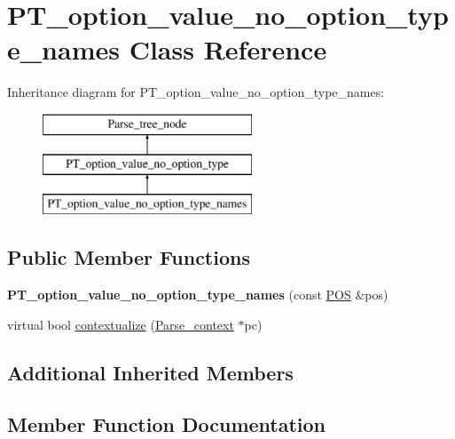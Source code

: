 \hypertarget{classPT__option__value__no__option__type__names}{}\section{P\+T\+\_\+option\+\_\+value\+\_\+no\+\_\+option\+\_\+type\+\_\+names Class Reference}
\label{classPT__option__value__no__option__type__names}
Inheritance diagram for P\+T\+\_\+option\+\_\+value\+\_\+no\+\_\+option\+\_\+type\+\_\+names\+:\begin{figure}[H]
\begin{center}
\leavevmode
\includegraphics[height=3.000000cm]{classPT__option__value__no__option__type__names}
\end{center}
\end{figure}
\subsection*{Public Member Functions}
\begin{DoxyCompactItemize}
\item 
\mbox{\label{classPT__option__value__no__option__type__names_a7d6ef7436bb4f977e8b4622054dd9e30}} 
{\bfseries P\+T\+\_\+option\+\_\+value\+\_\+no\+\_\+option\+\_\+type\+\_\+names} (const \mbox{\hyperlink{structYYLTYPE}{P\+OS}} \&pos)
\item 
virtual bool \mbox{\hyperlink{classPT__option__value__no__option__type__names_a3d4e80876b3575185f363e96a550f250}{contextualize}} (\mbox{\hyperlink{structParse__context}{Parse\+\_\+context}} $\ast$pc)
\end{DoxyCompactItemize}
\subsection*{Additional Inherited Members}


\subsection{Member Function Documentation}
\mbox{\label{classPT__option__value__no__option__type__names_a3d4e80876b3575185f363e96a550f250}} 

